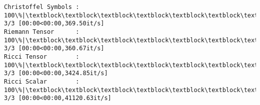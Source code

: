 \documentclass[11pt]{article}
\newcommand{\prompt}[4]{
        {\ttfamily\llap{{\color{#2}[#3]:\hspace{3pt}#4}}\vspace{-\baselineskip}}
    }
\begin{document}
    \begin{Verbatim}[commandchars=\\\{\}]
Christoffel Symbols : 100\%|\textblock\textblock\textblock\textblock\textblock\textblock\textblock\textblock\textblock\textblock\textblock\textblock\textblock\textblock\textblock\textblock\textblock\textblock\textblock\textblock\textblock\textblock\textblock\textblock\textblock\textblock\textblock\textblock\textblock\textblock\textblock\textblock\textblock\textblock| 3/3 [00:00<00:00,369.50it/s]
Riemann Tensor      : 100\%|\textblock\textblock\textblock\textblock\textblock\textblock\textblock\textblock\textblock\textblock\textblock\textblock\textblock\textblock\textblock\textblock\textblock\textblock\textblock\textblock\textblock\textblock\textblock\textblock\textblock\textblock\textblock\textblock\textblock\textblock\textblock\textblock\textblock\textblock| 3/3 [00:00<00:00,360.67it/s]
Ricci Tensor        : 100\%|\textblock\textblock\textblock\textblock\textblock\textblock\textblock\textblock\textblock\textblock\textblock\textblock\textblock\textblock\textblock\textblock\textblock\textblock\textblock\textblock\textblock\textblock\textblock\textblock\textblock\textblock\textblock\textblock\textblock\textblock\textblock\textblock\textblock| 3/3 [00:00<00:00,3424.85it/s]
Ricci Scalar        : 100\%|\textblock\textblock\textblock\textblock\textblock\textblock\textblock\textblock\textblock\textblock\textblock\textblock\textblock\textblock\textblock\textblock\textblock\textblock\textblock\textblock\textblock\textblock\textblock\textblock\textblock\textblock\textblock\textblock\textblock\textblock\textblock\textblock| 3/3 [00:00<00:00,41120.63it/s]
    \end{Verbatim}
 
            
\prompt{Out}{outcolor}{8}{}
    
\end{document}

